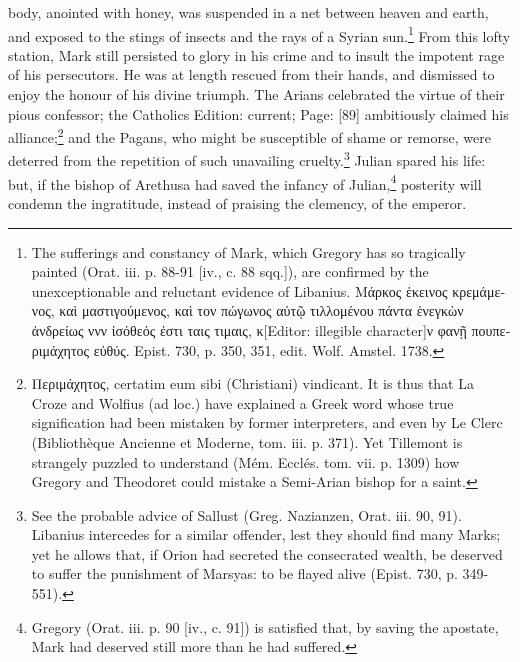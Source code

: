 body, anointed with honey, was suspended in a net between heaven and earth, and exposed to the stings of insects and the rays of a Syrian sun.\footnote{The sufferings and constancy of Mark, which Gregory has so tragically painted (Orat. iii. p. 88-91 [iv., c. 88 sqq.]), are confirmed by the unexceptionable and reluctant evidence of Libanius. \textgreek{Μάρκος \texthebrew{ἑ}κεινος κρεμάμενος, κα\texthebrew{ὶ} μαστιγούμενος, κα\texthebrew{ὶ} τον πώγωνος α\texthebrew{ὐ}τ\texthebrew{ῷ} τιλλομένου πάντα \texthebrew{ἑ}νεγκ\texthebrew{ὼ}ν \texthebrew{ἀ}νδρείως ννν \texthebrew{ἰ}σόθεός \texthebrew{ἐ}στι ταις τιμαις, κ}[Editor: illegible character]\textgreek{ν φαν\texthebrew{ῇ} πουπεριμάχητος ε\texthebrew{ὐ}θύς}. Epist. 730, p. 350, 351, edit. Wolf. Amstel. 1738.} From this lofty station, Mark still persisted to glory in his crime and to insult the impotent rage of his persecutors. He was at length rescued from their hands, and dismissed to enjoy the honour of his divine triumph. The Arians celebrated the virtue of their pious confessor; the Catholics Edition: current; Page: [89] ambitiously claimed his alliance;\footnote{\textgreek{Περιμάχητος}, certatim eum sibi (Christiani) vindicant. It is thus that La Croze and Wolfius (ad loc.) have explained a Greek word whose true signification had been mistaken by former interpreters, and even by Le Clerc (Bibliothèque Ancienne et Moderne, tom. iii. p. 371). Yet Tillemont is strangely puzzled to understand (Mém. Ecclés. tom. vii. p. 1309) how Gregory and Theodoret could mistake a Semi-Arian bishop for a saint.} and the Pagans, who might be susceptible of shame or remorse, were deterred from the repetition of such unavailing cruelty.\footnote{See the probable advice of Sallust (Greg. Nazianzen, Orat. iii. 90, 91). Libanius intercedes for a similar offender, lest they should find many Marks; yet he allows that, if Orion had secreted the consecrated wealth, be deserved to suffer the punishment of Marsyas: to be flayed alive (Epist. 730, p. 349-551).} Julian spared his life: but, if the bishop of Arethusa had saved the infancy of Julian,\footnote{Gregory (Orat. iii. p. 90 [iv., c. 91]) is satisfied that, by saving the apostate, Mark had deserved still more than he had suffered.} posterity will condemn the ingratitude, instead of praising the clemency, of the emperor.

